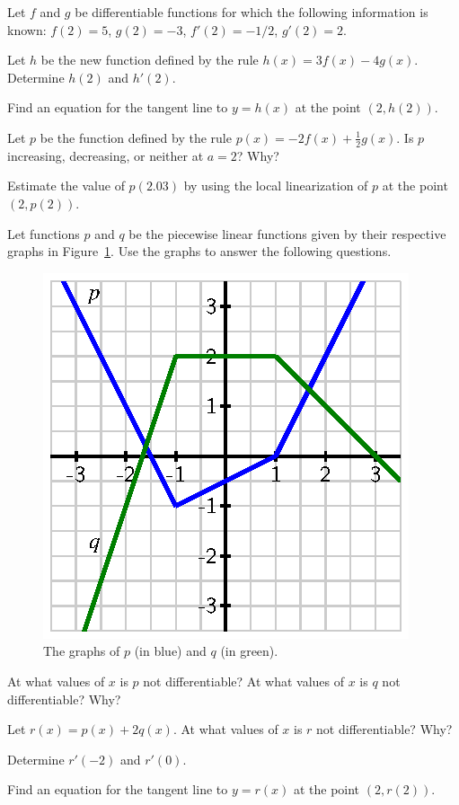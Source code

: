 \begin{exercises} 
\item Let $f$ and $g$ be differentiable functions for which the following information is known:  $f(2) = 5$, $g(2) = -3$, $f'(2) = -1/2$, $g'(2) = 2$.
\ba
	\item Let $h$ be the new function defined by the rule $h(x) = 3f(x) - 4g(x)$.  Determine $h(2)$ and $h'(2)$.
	\item Find an equation for the tangent line to $y = h(x)$ at the point $(2,h(2))$.
	\item Let $p$ be the function defined by the rule $p(x) = -2f(x) + \frac{1}{2}g(x)$.  Is $p$ increasing, decreasing, or neither at $a = 2$?  Why?
	\item Estimate the value of $p(2.03)$ by using the local linearization of $p$ at the point $(2,p(2))$.
\ea
\begin{exerciseSolution}
\end{exerciseSolution}

\item Let functions $p$ and $q$ be the piecewise linear functions given by their respective graphs in Figure~\ref{F:2.1.Ez3}.  Use the graphs to answer the following questions.
\begin{figure}[h]
\begin{center}
\includegraphics{figures/2_1_Ez3.eps}
\caption{The graphs of $p$ (in blue) and $q$ (in green).} \label{F:2.1.Ez3}
\end{center}
\end{figure}
\ba
	\item At what values of $x$ is $p$ not differentiable?  At what values of $x$ is $q$ not differentiable? Why?
	\item Let $r(x) = p(x) + 2q(x)$.  At what values of $x$ is $r$ not differentiable? Why?
	\item Determine $r'(-2)$ and $r'(0)$.
	\item Find an equation for the tangent line to $y = r(x)$ at the point $(2,r(2))$.
\ea


\end{exercises}

